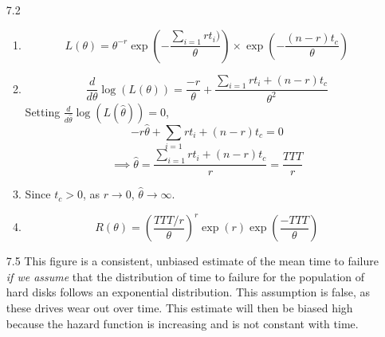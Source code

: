 \documentclass[12pt]{article}\usepackage[]{graphicx}\usepackage[]{color}
\newenvironment{knitrout}{}{} %
\begin{document}
\begin{enumerate}
\begin{enumerate}
\begin{knitrout}
\end{knitrout}
\end{enumerate}
\item[7.2]
\begin{enumerate}
\item
\[L(\theta) = \theta^{-r} \exp\left(- \frac{\sum_{i=1}{r} t_i)}{\theta}\right) \times \exp\left( - \frac{(n-r)t_c}{\theta}\right)\]

\item
\[\frac{d}{d\theta}\log(L(\theta)) = \frac{-r}{\theta} + \frac{\sum_{i=1}{r}t_i + (n-r)t_c}{\theta^2}\]
Setting $\frac{d}{d\hat{\theta}}\log(L(\hat{\theta})) =0$,
\[-r\hat{\theta} + \sum_{i=1}{r}t_i + (n-r)t_c = 0\]
\[\implies \hat{\theta} = \frac{\sum_{i=1}{r}t_i + (n-r)t_c}{r} = \frac{TTT}{r}\]

\item
Since $t_c>0$, as $r \rightarrow 0$, $\hat{\theta} \rightarrow \infty$.

\item
\[R(\theta) = \left(\frac{TTT/r}{\theta}\right)^r \exp(r) \exp\left(\frac{-TTT}{\theta}\right)\]

\end{enumerate}
\item[7.5]
This figure is a consistent,  unbiased estimate of the mean time to failure {\em if we assume} that the distribution of time to failure for the population of hard disks follows an exponential distribution. This assumption is false, as these drives wear out over time. This estimate will then be biased high because the hazard function is increasing and is not constant with time.

\end{enumerate}
\end{document}
